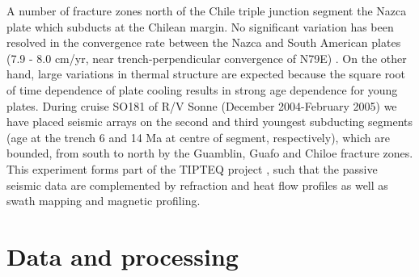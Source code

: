 \documentclass[reviewcopy]{elsart}
\begin{document}
A number of fracture zones north of the Chile triple junction segment
the Nazca plate which subducts at the Chilean margin. No significant
variation has been resolved in 
%
%
the convergence rate between the Nazca and South American
plates (7.9  - 8.0 cm/yr, near trench-perpendicular convergence of
N79E) \citep{demets94}. 
On the other hand, large variations in thermal structure are expected
because the square root of time dependence of plate cooling results in
strong age dependence for young plates.
During cruise SO181 of R/V Sonne (December 2004-February 2005) we have placed seismic arrays on the second and
third youngest subducting 
segments (age at the trench 6 and 14 Ma at centre of segment, respectively), which are
bounded, from south to north by the Guamblin, Guafo and Chiloe
fracture zones.  This
experiment forms part of the TIPTEQ project \citep{scherwath06}, such that the passive
seismic data are complemented by refraction and heat flow profiles as
well as swath mapping and magnetic profiling. 

\section{Data and processing}
\end{document}
